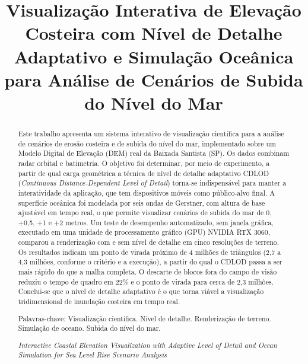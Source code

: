\documentclass[conference]{IEEEtran}
\begin{document}
\title{Visualização Interativa de Elevação Costeira com Nível de Detalhe
Adaptativo e Simulação Oceânica para Análise de Cenários de Subida do
Nível do Mar}

\author{
}

\maketitle

\begin{abstract}
Este trabalho apresenta um sistema interativo de visualização científica
para a análise de cenários de erosão costeira e de subida do nível do mar,
implementado sobre um Modelo Digital de Elevação (DEM) real da Baixada
Santista (SP). Os dados combinam radar orbital e batimetria.  O objetivo foi determinar, por meio
de experimento, a partir de qual carga geométrica a técnica de nível de
detalhe adaptativo CDLOD (\emph{Continuous Distance-Dependent Level of
Detail}) torna-se indispensável para manter a interatividade da aplicação,
que tem dispositivos móveis como público-alvo final. A superfície oceânica
foi modelada por seis ondas de Gerstner, com altura de base ajustável em
tempo real, o que permite visualizar cenários de subida do mar de 0, +0,5,
+1 e +2 metros. Um teste de desempenho automatizado, sem janela gráfica,
executado em uma unidade de processamento gráfico (GPU) NVIDIA RTX 3060,
comparou a renderização com e sem nível de detalhe em cinco resoluções de
terreno. Os resultados indicam um ponto de virada próximo de 4 milhões de triângulos (2,7 a 4,3 milhões, conforme o critério e a execução), a partir do qual o CDLOD passa a ser mais rápido do que a malha completa. O descarte de blocos fora do campo de visão reduziu o tempo de quadro em 22\% e o ponto de virada para cerca de 2,3 milhões. Conclui-se que o nível de detalhe adaptativo é o que
torna viável a visualização tridimensional de inundação costeira em tempo
real.

Palavras-chave: Visualização científica. Nível de detalhe. Renderização de
terreno. Simulação de oceano. Subida do nível do mar.

\textit{Interactive Coastal Elevation Visualization with Adaptive Level of
Detail and Ocean Simulation for Sea Level Rise Scenario Analysis}


\end{abstract}
\end{document}
